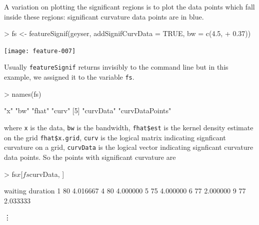 \documentclass[a4paper,11pt]{article}
\begin{document}
A variation on plotting the significant regions is to plot the data points which
fall inside these regions:
significant curvature data points are in blue.
\begin{center}
\begin{Schunk}
\begin{Sinput}
> fs <- featureSignif(geyser, addSignifCurvData = TRUE, bw = c(4.5, 
+     0.37))
\end{Sinput}
\end{Schunk}
\texttt{[image: feature-007]}
\end{center}

Usually \texttt{featureSignif} returns invisibly to the command line 
but in this example, we assigned it to the variable \texttt{fs}.
\begin{Schunk}
\begin{Sinput}
> names(fs)
\end{Sinput}
\begin{Soutput}
[1] "x"              "bw"             "fhat"           "curv"          
[5] "curvData"       "curvDataPoints"
\end{Soutput}
\end{Schunk}
where \texttt{x} is the data, \texttt{bw} is the bandwidth, \texttt{fhat\$est} 
is the kernel density estimate
on the grid \texttt{fhat\$x.grid}, 
\texttt{curv} is the logical matrix indicating signficant curvature on a grid,
\texttt{curvData} is the logical vector indicating signficant curvature data points.
So the points with significant curvature are 
\begin{Schunk}
\begin{Sinput}
> fs$x[fs$curvData, ]
\end{Sinput}
\end{Schunk}
\begin{Schunk}
\begin{Soutput}
  waiting duration
1      80 4.016667
4      80 4.000000
5      75 4.000000
6      77 2.000000
9      77 2.033333
\end{Soutput}
\end{Schunk}
\vdots
\end{document}
